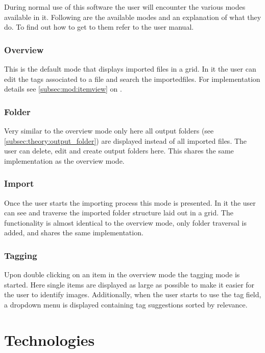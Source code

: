 During normal use of this software the user will encounter the various modes
available in it. Following are the available modes and an explanation of what
they do. To find out how to get to them refer to the user manual.

\subsubsection{Overview}%
\label{theory:overview_mode}

This is the default mode that displays imported files in a grid. In it the user
can edit the tags associated to a file and search the importedfiles. For
implementation details see \cref{subsec:mod:itemview} on
.

\subsubsection{Folder}%
\label{theory:folder_mode}

Very similar to the overview mode only here all output folders (see
\cref{subsec:theory:output_folder}) are displayed instead of all imported
files. The user can delete, edit and create output folders here. This shares
the same implementation as the overview mode.

\subsubsection{Import}%
\label{theory:import_mode}

Once the user starts the importing process this mode is presented. In it the
user can see and traverse the imported folder structure laid out in a grid. The
functionality is almost identical to the overview mode, only folder traversal
is added, and shares the same implementation.

\subsubsection{Tagging}%
\label{theory:tagging_mode}

Upon double clicking on an item in the overview mode the tagging mode is
started. Here single items are displayed as large as possible to make it easier
for the user to identify images. Additionally, when the user starts to use the
tag field, a dropdown menu is displayed containing tag suggestions sorted by
relevance.

\section{Technologies}
\def\kapitelautor{Christoph Führer}
